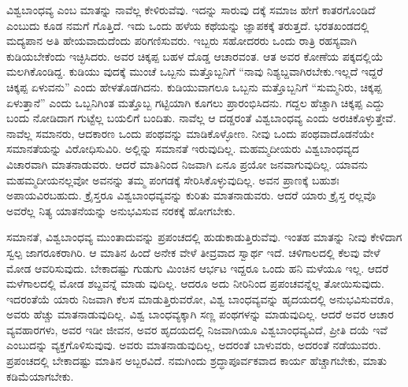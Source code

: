 ವಿಶ್ವಬಾಂಧವ್ಯ ಎಂಬ ಮಾತನ್ನು ನಾವೆಲ್ಲ ಕೇಳಿರುವೆವು. ಇದನ್ನು ಸಾರುವು ದಕ್ಕೆ ಸಮಾಜ ಹೇಗೆ ಕಾತರಗೊಂಡಿದೆ ಎಂಬುದು ಕೂಡ ನಮಗೆ ಗೊತ್ತಿದೆ. ಇದು ಒಂದು ಹಳೆಯ ಕಥೆಯನ್ನು ಜ್ಞಾಪಕಕ್ಕೆ ತರುತ್ತದೆ. ಭರತಖಂಡದಲ್ಲಿ ಮದ್ಯಪಾನ ಅತಿ ಹೇಯವಾದುದೆಂದು ಪರಿಗಣಿಸುವರು. ಇಬ್ಬರು ಸಹೋದರರು ಒಂದು ರಾತ್ರಿ ರಹಸ್ಯವಾಗಿ ಕುಡಿಯಬೇಕೆಂದು ಇಚ್ಛಿಸಿದರು. ಅವರ ಚಿಕ್ಕಪ್ಪ ಬಹಳ ದೊಡ್ಡ ಆಚಾರವಂತ. ಆತ ಅವರ ಕೋಣೆಯ ಪಕ್ಕದಲ್ಲಿಯೆ ಮಲಗಿಕೊಂಡಿದ್ದ. ಕುಡಿಯು ವುದಕ್ಕೆ ಮುಂಚೆ ಒಬ್ಬನು ಮತ್ತೊಬ್ಬನಿಗೆ “ನಾವು ನಿಶ್ಯಬ್ದವಾಗಿರಬೇಕು.ಇಲ್ಲದೆ ಇದ್ದರೆ ಚಿಕ್ಕಪ್ಪ ಏಳುವನು” ಎಂದು ಹೇಳತೊಡಗಿದನು. ಕುಡಿಯುವಾಗಲೂ ಒಬ್ಬನು ಮತ್ತೊಬ್ಬನಿಗೆ “ಸುಮ್ಮನಿರು, ಚಿಕ್ಕಪ್ಪ ಏಳುತ್ತಾನೆ” ಎಂದು ಒಬ್ಬನಿಗಿಂತ ಮತ್ತೊಬ್ಬ ಗಟ್ಟಿಯಾಗಿ ಕೂಗಲು ಪ್ರಾರಂಭಿಸಿದನು. ಗದ್ದಲ ಹೆಚ್ಚಾಗಿ ಚಿಕ್ಕಪ್ಪ ಎದ್ದು ಬಂದು ನೋಡಿದಾಗ ಗುಟ್ಟೆಲ್ಲ ಬಯಲಿಗೆ ಬಂದಿತು. ನಾವೆಲ್ಲ ಆ ದಡ್ಡರಂತೆ ವಿಶ್ವಬಾಂಧವ್ಯ ಎಂದು ಅರಚಿಕೊಳ್ಳುತ್ತೇವೆ. ನಾವೆಲ್ಲ ಸಮಾನರು, ಆದಕಾರಣ ಒಂದು ಪಂಥವನ್ನು ಮಾಡಿಕೊಳ್ಳೋಣ. ನೀವು ಒಂದು ಪಂಥವಾದೊಡನೆಯೇ ಸಮಾನತೆಯನ್ನು ವಿರೋಧಿಸುವಿರಿ. ಅಲ್ಲಿನ್ನು ಸಮಾನತೆ ಇರುವುದಿಲ್ಲ. ಮಹಮ್ಮದೀಯರು ವಿಶ್ವಬಾಂಧವ್ಯದ ವಿಚಾರವಾಗಿ ಮಾತನಾಡುವರು. ಆದರೆ ಮಾತಿನಿಂದ ನಿಜವಾಗಿ ಏನೂ ಪ್ರಯೋ ಜನವಾಗುವುದಿಲ್ಲ. ಯಾವನು ಮಹಮ್ಮದೀಯನಲ್ಲವೋ ಅವನನ್ನು ತಮ್ಮ ಪಂಗಡಕ್ಕೆ ಸೇರಿಸಿಕೊಳ್ಳುವುದಿಲ್ಲ. ಅವನ ಪ್ರಾಣಕ್ಕೆ ಬಹುಶಃ ಅಪಾಯವಿರಬಹುದು. ಕ್ರೈಸ್ತರೂ ವಿಶ್ವಬಾಂಧವ್ಯವನ್ನು ಕುರಿತು ಮಾತನಾಡುವರು. ಆದರೆ ಯಾರು ಕ್ರೈಸ್ತ ರಲ್ಲವೊ ಅವರೆಲ್ಲ ನಿತ್ಯ ಯಾತನೆಯನ್ನು ಅನುಭವಿಸುವ ನರಕಕ್ಕೆ ಹೋಗಬೇಕು.

ಸಮಾನತೆ, ವಿಶ್ವಬಾಂಧವ್ಯ ಮುಂತಾದುವನ್ನು ಪ್ರಪಂಚದಲ್ಲಿ ಹುಡುಕಾಡುತ್ತಿರುವೆವು. ಇಂತಹ ಮಾತನ್ನು ನೀವು ಕೇಳಿದಾಗ ಸ್ವಲ್ಪ ಜಾಗರೂಕರಾಗಿರಿ. ಆ ಮಾತಿನ ಹಿಂದೆ ಅನೇಕ ವೇಳೆ ತೀವ್ರವಾದ ಸ್ವಾರ್ಥ ಇದೆ. ಚಳಿಗಾಲದಲ್ಲಿ ಕೆಲವು ವೇಳೆ ಮೋಡ ಆವರಿಸುವುದು. ಬೇಕಾದಷ್ಟು ಗುಡುಗು ಮಿಂಚಿನ ಆರ್ಭಟ ಇದ್ದರೂ ಒಂದು ಹನಿ ಮಳೆಯೂ ಇಲ್ಲ. ಆದರೆ ಮಳೆಗಾಲದಲ್ಲಿ ಮೋಡ ಶಬ್ದವನ್ನೆ ಮಾಡು ವುದಿಲ್ಲ. ಆದರೂ ಅದು ನೀರಿನಿಂದ ಪ್ರಪಂಚವನ್ನೆಲ್ಲ ತೋಯಿಸುವುದು. ಇದರಂತೆಯೆ ಯಾರು ನಿಜವಾಗಿ ಕೆಲಸ ಮಾಡುತ್ತಿರುವರೋ, ವಿಶ್ವ ಬಾಂಧವ್ಯವನ್ನು ಹೃದಯದಲ್ಲಿ ಅನುಭವಿಸುವರೊ, ಅವರು ಹೆಚ್ಚು ಮಾತನಾಡುವುದಿಲ್ಲ. ವಿಶ್ವ ಬಾಂಧವ್ಯಕ್ಕಾಗಿ ಸಣ್ಣ ಪಂಥಗಳನ್ನು ಮಾಡುವುದಿಲ್ಲ. ಆದರೆ ಅವರ ಆಚಾರ ವ್ಯವಹಾರಗಳು, ಅವರ ಇಡೀ ಜೀವನ, ಅವರ ಹೃದಯದಲ್ಲಿ ನಿಜವಾಗಿಯೂ ವಿಶ್ವಬಾಂಧವ್ಯವಿದೆ, ಪ್ರೀತಿ ದಯೆ ಇವೆ ಎಂಬುದನ್ನು ವ್ಯಕ್ತಗೊಳಿಸುವುವು. ಅವರು ಮಾತನಾಡುವುದಿಲ್ಲ, ಅದರಂತೆ ಬಾಳುವರು, ಅದರಂತೆ ನಡೆಯುವರು. ಪ್ರಪಂಚದಲ್ಲಿ ಬೇಕಾದಷ್ಟು ಮಾತಿನ ಅಬ್ಬರವಿದೆ. ನಮಗಿಂದು ಶ್ರದ್ಧಾಪೂರ್ವಕವಾದ ಕಾರ್ಯ ಹೆಚ್ಚಾಗಬೇಕು, ಮಾತು ಕಡಿಮೆಯಾಗಬೇಕು.


